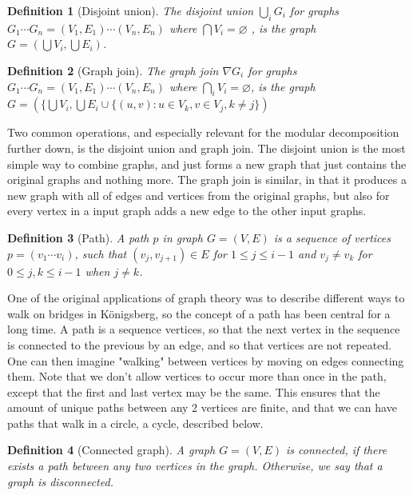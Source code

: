 \documentclass[a4paper]{article}
\newtheorem{definition}{Definition}[section]
\begin{document}
\begin{definition}[Disjoint union]
    The disjoint union $\bigcup_i G_i$ for graphs 
    $G_1 \cdots G_n = (V_1,E_1) \cdots (V_n,E_n)$ where 
    $\bigcap V_i = \varnothing $ , is the graph
    $G = \left( \bigcup V_i,\bigcup E_i \right)$.
\end{definition}

\begin{definition}[Graph join]
    The graph join $\nabla G_i$ for graphs $G_1 \cdots G_n = (V_1,E_1) \cdots (V_n,E_n)$ where 
    $\bigcap_i V_i = \varnothing$, is the graph $G = (\{\bigcup V_i,
    \bigcup E_i \cup \{(u,v) : u \in V_k, v \in V_j, k \neq j \})$
\end{definition}

Two common operations, and especially relevant for the modular decomposition
further down, is the disjoint union and graph join. The disjoint union is the
most simple way to combine graphs, and just forms a new graph that just
contains the original graphs and nothing more.  The graph join is similar, in
that it produces a new graph with all of edges and vertices from the original
graphs, but also for every vertex in a input graph adds a new edge to the other
input graphs.



\begin{definition}[Path]
    A path $p$ in graph $G = (V,E)$ is a sequence of vertices $p = (v_1\cdots
    v_i)$, such that $(v_j,v_{j+1}) \in E$ for $1 \leq j \leq i-1$ and $v_j \neq v_k$ 
    for $0 \leq j,k \leq i-1$ when $j \neq k$.
\end{definition}

One of the original applications of graph theory was to describe different ways
to walk on bridges in Königsberg, so the concept of a path has been central for
a long time.  A path is a sequence vertices, so that the next vertex in the
sequence is connected to the previous by an edge, and so that vertices are not
repeated.  One can then imagine "walking" between vertices by moving on edges
connecting them.  Note that we don't allow vertices to occur more than once in
the path, except that the first and last vertex may be the same. This ensures
that the amount of unique paths between any 2 vertices are finite, and that
we can have paths that walk in a circle, a cycle, described below.

\begin{definition}[Connected graph]
    A graph $G = (V,E)$ is connected, if there exists a path between any two
    vertices in the graph. Otherwise, we say that a graph is disconnected.
\end{definition}
\end{document}
